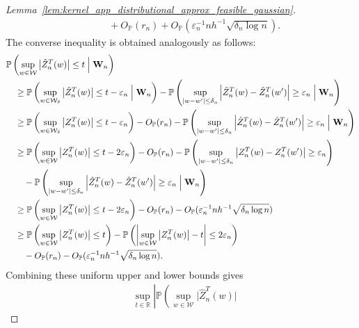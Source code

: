\documentclass[11pt,lof]{puthesis}
\renewcommand{\P}{\ensuremath{\mathbb{P}}}
\newcommand{\R}{\ensuremath{\mathbb{R}}}
\newcommand{\bW}{\ensuremath{\mathbf{W}}}
\newcommand{\cW}{\ensuremath{\mathcal{W}}}
\theoremstyle{break}
\theoremstyle{proof}
\newtheorem{proof}{Proof}
\begin{document}
\begin{proof}[%
  Lemma~\ref{lem:kernel_app_distributional_approx_feasible_gaussian}]
\begin{align*}
    &\qquad+
    O_\P(r_n)
    + O_\P(\varepsilon_n^{-1} n h^{-1} \sqrt{\delta_n \log n}).
  \end{align*}
  The converse inequality is obtained
  analogously as follows:
  \begin{align*}
    &\P\left(
      \sup_{w \in \cW}
      \big| \hat Z_n^T(w) \big|
      \leq t
      \Bigm\vert \bW_n
    \right) \\
    &\quad\geq
    \P\left(
      \sup_{w \in \cW_\delta}
      \big| \hat Z_n^T(w) \big|
      \leq t - \varepsilon_n
      \Bigm\vert \bW_n
    \right)
    - \P\left(
      \sup_{|w-w'| \leq \delta_n}
      \left|
      \hat Z_n^T(w)
      - \hat Z_n^T(w')
      \right|
      \geq \varepsilon_n
      \Bigm\vert \bW_n
    \right) \\
    &\quad\geq
    \P\left(
      \sup_{w \in \cW_\delta}
      \big| Z_n^T(w) \big|
      \leq t - \varepsilon_n
    \right)
    - O_\P(r_n)
    - \P\left(
      \sup_{|w-w'| \leq \delta_n}
      \left|
      \hat Z_n^T(w)
      - \hat Z_n^T(w')
      \right|
      \geq \varepsilon_n
      \Bigm\vert \bW_n
    \right) \\
    &\quad\geq
    \P\left(
      \sup_{w \in \cW}
      \big| Z_n^T(w) \big|
      \leq t - 2\varepsilon_n
    \right)
    - O_\P(r_n)
    - \P\left(
      \sup_{|w-w'| \leq \delta_n}
      \left|
      Z_n^T(w)
      - Z_n^T(w')
      \right|
      \geq \varepsilon_n
    \right) \\
    &\qquad-
    \P\left(
      \sup_{|w-w'| \leq \delta_n}
      \left|
      \hat Z_n^T(w)
      - \hat Z_n^T(w')
      \right|
      \geq \varepsilon_n
      \Bigm\vert \bW_n
    \right) \\
    &\quad\geq
    \P\left(
      \sup_{w \in \cW}
      \big| Z_n^T(w) \big|
      \leq t - 2\varepsilon_n
    \right)
    - O_\P(r_n)
    - O_\P(\varepsilon_n^{-1} n h^{-1} \sqrt{\delta_n \log n}) \\
    &\quad\geq
    \P\left(
      \sup_{w \in \cW}
      \big| Z_n^T(w) \big|
      \leq t
    \right)
    - \P\left(
      \left|
      \sup_{w \in \cW}
      \big| Z_n^T(w) \big|
      - t
      \right|
      \leq 2\varepsilon_n
    \right) \\
    &\qquad-
    O_\P(r_n)
    - O_\P(\varepsilon_n^{-1} n h^{-1} \sqrt{\delta_n \log n}).
  \end{align*}
  Combining these uniform upper and lower bounds gives
  \begin{align*}
    &\sup_{t \in \R}
    \left|
    \P\left(
      \sup_{w \in \cW}
      \big| \hat Z_n^T(w) \big|

\end{align*}
\end{proof}
\end{document}

